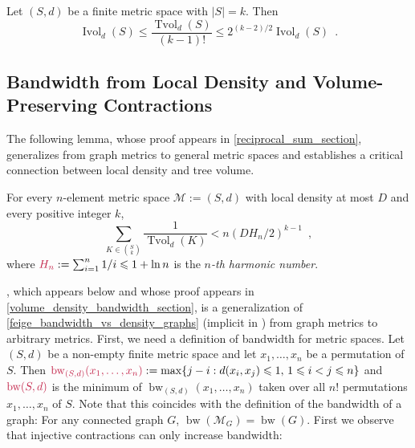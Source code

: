 \documentclass{patmorin}
\makeatletter
\renewcommand{\le}{\leqslant}
\newcommand{\david}[1]{{\color{orange} David: #1}}
\newcommand{\pat}[1]{\textcolor{Blue}{Pat: #1}}
\newcommand{\defin}[1]{\emph{\textcolor{brightmaroon}{#1}}}
\def\mathcolor#1#{\@mathcolor{#1}}
\def\@mathcolor#1#2#3{%
  \protect\leavevmode
  \begingroup
    \color#1{#2}#3%
  \endgroup
}
\newcommand{\mathdefin}[1]{\mathcolor{brightmaroon}{#1}}
\DeclareMathOperator{\bw}{bw}
\DeclareMathOperator{\ivol}{Ivol}
\DeclareMathOperator{\tvol}{Tvol}
\makeatother
\begin{document}
\begin{lem}
  Let $(S,d)$ be a finite metric space with $|S|=k$.  Then
  \[
    \ivol_{d}(S) \le \frac{\tvol_d(S)}{(k-1)!} \le 2^{(k-2)/2}\ivol_d(S) \enspace .
  \]
\end{lem}

\subsection{Bandwidth from Local Density and Volume-Preserving Contractions}

The following lemma, whose proof appears in \cref{reciprocal_sum_section}, generalizes \citet[Theorem~10]{feige:approximating} from graph metrics to general metric spaces and establishes a critical connection between local density and tree volume.

\begin{lem}\label{reciprocal_sum}
  For every $n$-element metric space $\mathcal{M}:=(S,d)$ with local density at most $D$ and every positive integer $k$,
  \[
    \sum_{K\in \binom{S}{k}}\frac{1}{\tvol_{d}(K)} < n(DH_n/2)^{k-1} \enspace ,
  \]
  where $\mathdefin{H_n}:=\sum_{i=1}^n 1/i\le 1+\ln n$ is the \defin{$n$-th harmonic number}.
\end{lem}



, which appears below and whose proof appears in
\cref{volume_density_bandwidth_section}, is a generalization of \cref{feige_bandwidth_vs_density_graphs} (implicit in \citet{feige:approximating}) from graph metrics to arbitrary metrics.
First, we need a definition of bandwidth for metric spaces.  Let $(S,d)$ be a non-empty finite metric space and let $x_1,\ldots,x_n$ be a permutation of $S$.  Then $\mathdefin{\bw_{(S,d)}(x_1,\ldots,x_n)}:=\max\{j-i:d(x_i,x_j)\le 1,\, 1\le i <j\le n\}$ and $\mathdefin{\bw(S,d)}$ is the minimum of $\bw_{(S,d)}(x_1,\ldots,x_n)$ taken over all $n!$ permutations $x_1,\ldots,x_n$ of $S$.  Note that this coincides with the definition of the bandwidth of a graph: For any connected graph $G$, $\bw(\mathcal{M}_G)=\bw(G)$.  First we observe that injective
contractions can only increase bandwidth:
\end{document}
